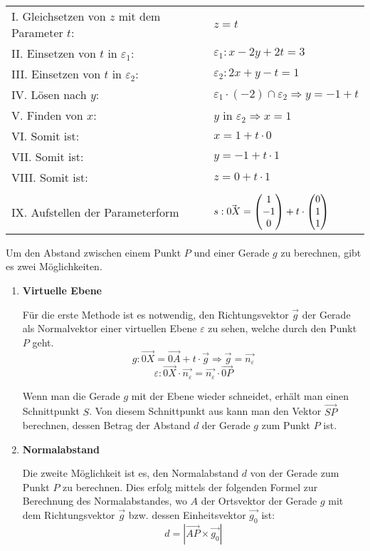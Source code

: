 \begin{itemize}
  \begin{table}[h!]
    \begin{tabular}{l l}
    I. Gleichsetzen von $z$ mit dem Parameter $t$: & $z = t$
    \\
    II. Einsetzen von $t$ in $\varepsilon_{1}$: & $\varepsilon_{1}: x - 2y + 2t = 3$
    \\
    III. Einsetzen von $t$ in $\varepsilon_{2}$: & $\varepsilon_{2}: 2x + y - t = 1$
    \\
    IV. L\"{o}sen nach $y$: & $\varepsilon_{1} \cdot (-2) \cap \varepsilon_{2} \Rightarrow y = -1 + t$
    \\
    V. Finden von $x$: & $y$ in $\varepsilon_{2} \Rightarrow x = 1$
    \\
    VI. Somit ist: & $x = 1 + t \cdot 0$
    \\
    VII. Somit ist: & $y = -1 + t \cdot 1$
    \\
    VIII. Somit ist: & $z = 0 + t \cdot 1$
    \\ & \\
    IX. Aufstellen der Parameterform & $s: \vec{0X} = \begin{pmatrix}1 \\ -1 \\ 0\end{pmatrix} + t \cdot \begin{pmatrix}0 \\ 1 \\ 1\end{pmatrix}$
    \end{tabular}
  \end{table}

\end{itemize}

\pagebreak


Um den Abstand zwischen einem Punkt $P$ und einer Gerade $g$ zu berechnen, gibt es zwei M\"{o}glichkeiten.

\begin{enumerate}
  \item{\textbf{Virtuelle Ebene}}

  F\"{u}r die erste Methode ist es notwendig, den Richtungsvektor $\vec{g}$ der Gerade als Normalvektor einer virtuellen Ebene $\varepsilon$ zu sehen, welche durch den Punkt $P$ geht. $$g: \vec{0X} = \vec{0A} + t \cdot \vec{g} \Rightarrow \vec{g} = \vec{n_{\varepsilon}}$$ $$\varepsilon: \vec{0X} \cdot \vec{n_{\varepsilon}} = \vec{n_{\varepsilon}} \cdot \vec{0P}$$

  Wenn man die Gerade $g$ mit der Ebene wieder schneidet, erh\"{a}lt man einen Schnittpunkt $S$. Von diesem Schnittpunkt aus kann man den Vektor $\vec{SP}$ berechnen, dessen Betrag der Abstand $d$ der Gerade $g$ zum Punkt $P$ ist. 

  \item{\textbf{Normalabstand}}

  Die zweite M\"{o}glichkeit ist es, den Normalabstand $d$ von der Gerade zum Punkt $P$ zu berechnen. Dies erfolg mittels der folgenden Formel zur Berechnung des Normalabstandes, wo $A$ der Ortsvektor der Gerade $g$ mit dem Richtungsvektor $\vec{g}$ bzw. dessen Einheitsvektor $\vec{g_{0}}$ ist: $$d = |\vec{AP} \times \vec{g_{0}}|$$

\end{enumerate}

